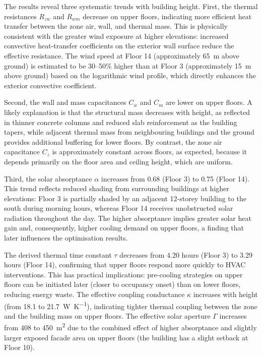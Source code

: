 \documentclass[11pt]{article}
\providecommand{\W}{\watt}
\providecommand{\K}{\kelvin}
\providecommand{\m}{\metre}
\begin{document}
The results reveal three systematic trends with building height. First, the thermal resistances $R_{zw}$ and $R_{wm}$ decrease on upper floors, indicating more efficient heat transfer between the zone air, wall, and thermal mass. This is physically consistent with the greater wind exposure at higher elevations: increased convective heat-transfer coefficients on the exterior wall surface reduce the effective resistance. The wind speed at Floor 14 (approximately \SI{65}{\m} above ground) is estimated to be 30--50\% higher than at Floor 3 (approximately \SI{15}{\m} above ground) based on the logarithmic wind profile, which directly enhances the exterior convective coefficient.

Second, the wall and mass capacitances $C_w$ and $C_m$ are lower on upper floors. A likely explanation is that the structural mass decreases with height, as reflected in thinner concrete columns and reduced slab reinforcement as the building tapers, while adjacent thermal mass from neighbouring buildings and the ground provides additional buffering for lower floors. By contrast, the zone air capacitance $C_z$ is approximately constant across floors, as expected, because it depends primarily on the floor area and ceiling height, which are uniform.

Third, the solar absorptance $\alpha$ increases from 0.68 (Floor 3) to 0.75 (Floor 14). This trend reflects reduced shading from surrounding buildings at higher elevations: Floor 3 is partially shaded by an adjacent 12-storey building to the south during morning hours, whereas Floor 14 receives unobstructed solar radiation throughout the day. The higher absorptance implies greater solar heat gain and, consequently, higher cooling demand on upper floors, a finding that later influences the optimisation results.

The derived thermal time constant $\tau$ decreases from 4.20 hours (Floor 3) to 3.29 hours (Floor 14), confirming that upper floors respond more quickly to HVAC interventions. This has practical implications: pre-cooling strategies on upper floors can be initiated later (closer to occupancy onset) than on lower floors, reducing energy waste. The effective coupling conductance $\kappa$ increases with height (from 18.1 to \SI{21.7}{\W\per\K}), indicating tighter thermal coupling between the zone and the building mass on upper floors. The effective solar aperture $\Gamma$ increases from 408 to \SI{450}{\square\m} due to the combined effect of higher absorptance and slightly larger exposed facade area on upper floors (the building has a slight setback at Floor 10).
\end{document}
